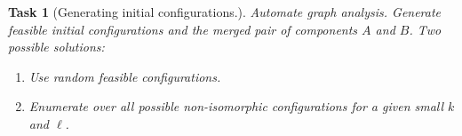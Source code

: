 \documentclass[a4paper,USenglish]{lipics-v2019}
\newtheorem{task}{Task}
\begin{document}
\begin{task}[Generating initial configurations.]

Automate graph analysis. Generate feasible initial configurations and the
merged pair of components $A$ and $B$. Two
possible solutions:
\begin{enumerate}
    \item Use
random feasible configurations.
\item Enumerate over all possible non-isomorphic configurations for a given small $k$
    and $\ell$.
\end{enumerate}
\end{task}




  
  


\appendix
\end{document}
